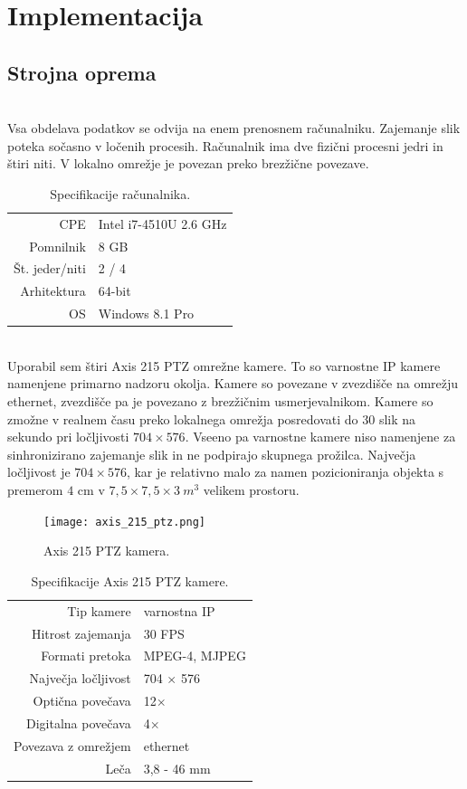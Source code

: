 \documentclass[a4paper, 12pt]{book}
\begin{document}
\chapter{Implementacija}

\section{Strojna oprema}

 \\
Vsa obdelava podatkov se odvija na enem prenosnem računalniku. Zajemanje slik poteka sočasno v ločenih procesih. Računalnik ima dve fizični procesni jedri in štiri niti. V lokalno omrežje je povezan preko brezžične povezave. 

\begin{table}[H]
\centering
\begin{tabular}{| r | l |}
\hline
CPE & Intel i7-4510U 2.6 GHz \\
Pomnilnik & 8 GB \\
Št. jeder/niti & 2 / 4 \\
Arhitektura & 64-bit \\
OS & Windows 8.1 Pro \\
\hline
\end{tabular}
\caption{Specifikacije računalnika.}
\end{table}

 \\
Uporabil sem štiri Axis 215 PTZ omrežne kamere. To so varnostne IP kamere namenjene primarno nadzoru okolja. Kamere so povezane v zvezdišče na omrežju ethernet, zvezdišče pa je povezano z brezžičnim usmerjevalnikom.  Kamere so zmožne v realnem času preko lokalnega omrežja posredovati do 30 slik na sekundo pri ločljivosti $704 \times 576$. Vseeno pa varnostne kamere niso namenjene za sinhronizirano zajemanje slik in ne podpirajo skupnega prožilca. Največja ločljivost je $704 \times 576$, kar je relativno malo za namen pozicioniranja objekta s premerom $4$ cm v $7,5 \times 7,5 \times 3 \ m^3$ velikem prostoru.
\begin{figure}[H]
\centering
\texttt{[image: axis\_215\_ptz.png]}
\caption{Axis 215 PTZ kamera.}
\end{figure}

\begin{table}[H]
\centering
\begin{tabular}{| r | l |}
\hline
Tip kamere & varnostna IP \\
Hitrost zajemanja & 30 FPS \\
Formati pretoka & MPEG-4, MJPEG \\
Največja ločljivost & 704 $\times$ 576 \\
Optična povečava & 12$\times$ \\
Digitalna povečava & 4$\times$ \\
Povezava z omrežjem & ethernet \\
Leča & 3,8 - 46 mm \\
\hline
\end{tabular}
\caption{Specifikacije Axis 215 PTZ kamere.}
\end{table}
\end{document}
